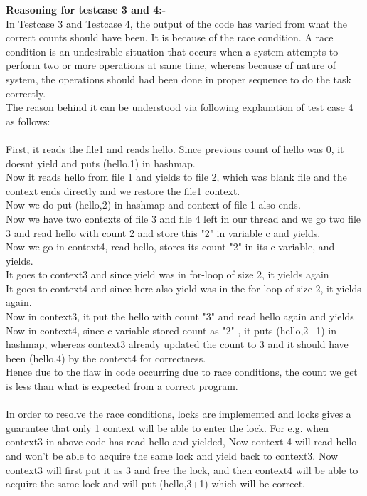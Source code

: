 \documentclass[12pt]{article}
\begin{document}
\begin{spacing}{1.2}
\textbf{Reasoning for testcase 3 and 4:-} \\
In Testcase 3 and Testcase 4, the output of the code has varied from what the correct counts should have been. It is because of the race condition. A race condition is an undesirable situation that occurs when a system attempts to perform two or more operations at same time, whereas because of nature of system, the operations should had been done in proper sequence to do the task correctly.\\
The reason behind it can be understood via following explanation of test case 4 as follows:\\
\\
First, it reads the file1 and reads hello. Since previous count of hello was 0, it doesnt yield and puts (hello,1) in hashmap.\\
Now it reads hello from file 1 and yields to file 2, which was blank file and the context ends directly and we restore the file1 context.\\
Now we do put (hello,2) in hashmap and context of file 1 also ends.\\
Now we have two contexts of file 3 and file 4 left in our thread and we go two file 3 and read hello with count 2 and store this "2" in variable c and yields.\\
Now we go in context4, read hello, stores its count "2" in its c variable, and yields.\\
It goes to context3 and since yield was in for-loop of size 2, it yields again\\
It goes to context4 and since here also yield was in the for-loop of size 2, it yields again.\\
Now in context3, it put the hello with count "3" and read hello again and yields\\
Now in context4, since c variable stored count as "2" , it puts (hello,2+1) in hashmap, whereas context3 already updated the count to 3 and it should have been (hello,4) by the context4 for correctness.\\
Hence due to the flaw in code occurring due to race conditions, the count we get is less than what is expected from a correct program.\\
\\
In order to resolve the race conditions, locks are implemented and locks gives a guarantee that only 1 context will be able to enter the lock. For e.g. when context3 in above code has read hello and yielded, Now context 4 will read hello and won’t be able to acquire the same lock and yield back to context3. Now context3 will first put it as 3 and free the lock, and then context4 will be able to acquire the same lock and will put (hello,3+1) which will be correct.\\

\end{spacing}
\end{document}
